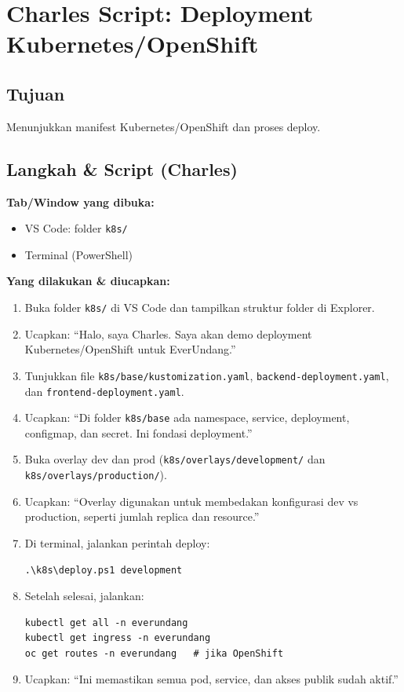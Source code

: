 \documentclass[11pt,a4paper]{article}
\begin{document}
\section{Charles Script: Deployment Kubernetes/OpenShift}
\subsection*{Tujuan}
Menunjukkan manifest Kubernetes/OpenShift dan proses deploy.

\subsection*{Langkah \& Script (Charles)}
\textbf{Tab/Window yang dibuka:}
\begin{itemize}
  \item VS Code: folder \texttt{k8s/}
  \item Terminal (PowerShell)
\end{itemize}

\textbf{Yang dilakukan \& diucapkan:}
\begin{enumerate}
  \item Buka folder \texttt{k8s/} di VS Code dan tampilkan struktur folder di Explorer.
  \item Ucapkan:
  “Halo, saya Charles. Saya akan demo deployment Kubernetes/OpenShift untuk EverUndang.”

  \item Tunjukkan file \texttt{k8s/base/kustomization.yaml}, \texttt{backend-deployment.yaml}, dan \texttt{frontend-deployment.yaml}.
  \item Ucapkan:
  “Di folder \texttt{k8s/base} ada namespace, service, deployment, configmap, dan secret. Ini fondasi deployment.”

  \item Buka overlay dev dan prod (\texttt{k8s/overlays/development/} dan \texttt{k8s/overlays/production/}).
  \item Ucapkan:
  “Overlay digunakan untuk membedakan konfigurasi dev vs production, seperti jumlah replica dan resource.”

  \item Di terminal, jalankan perintah deploy:
\begin{lstlisting}
.\k8s\deploy.ps1 development
\end{lstlisting}
  \item Setelah selesai, jalankan:
\begin{lstlisting}
kubectl get all -n everundang
kubectl get ingress -n everundang
oc get routes -n everundang   # jika OpenShift
\end{lstlisting}

  \item Ucapkan:
  “Ini memastikan semua pod, service, dan akses publik sudah aktif.”
\end{enumerate}
\end{document}
